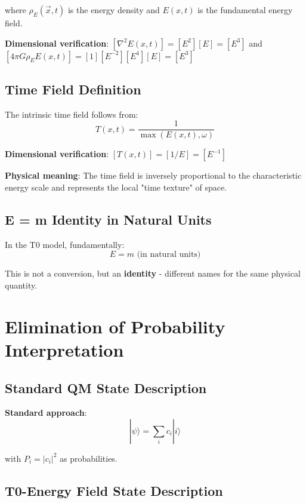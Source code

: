 \documentclass[12pt,a4paper]{article}
\newcommand{\Tfield}{T(x,t)}
\newcommand{\Efield}{E(x,t)}
\newcommand{\psiket}[1]{|#1\rangle}
\begin{document}
	where $\rho_E(\vec{x},t)$ is the energy density and $\Efield$ is the fundamental energy field.
	
	\textbf{Dimensional verification}: $[\nabla^2 \Efield] = [E^2][E] = [E^3]$ and $[4\pi G \rho_E \Efield] = [1][E^{-2}][E^4][E] = [E^3]$ \checkmark
	
	\subsection{Time Field Definition}
	
	The intrinsic time field follows from:
	\begin{equation}
		\boxed{\Tfield = \frac{1}{\max(\Efield, \omega)}}
		\label{eq:time_field_definition}
	\end{equation}
	
	\textbf{Dimensional verification}: $[\Tfield] = [1/E] = [E^{-1}]$ \checkmark
	
	\textbf{Physical meaning}: The time field is inversely proportional to the characteristic energy scale and represents the local "time texture" of space.
	
	\subsection{E = m Identity in Natural Units}
	
	In the T0 model, fundamentally:
	\begin{equation}
		\boxed{E = m \text{ (in natural units)}}
	\end{equation}
	
	This is not a conversion, but an \textbf{identity} - different names for the same physical quantity.
	
	\section{Elimination of Probability Interpretation}
	
	\subsection{Standard QM State Description}
	
	\textbf{Standard approach}:
	\begin{equation}
		\psiket{\psi} = \sum_i c_i \psiket{i}
	\end{equation}
	
	with $P_i = |c_i|^2$ as probabilities.
	
	\subsection{T0-Energy Field State Description}
	
\end{document}
